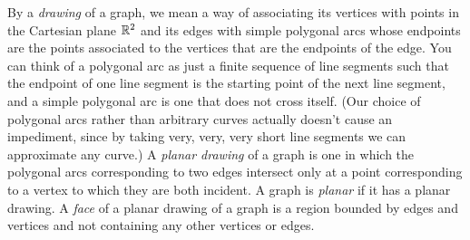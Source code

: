 By a \textit{drawing} of a graph, we mean a way of associating its
vertices with points in the Cartesian plane $\mathbb{R}^2$ and its edges
with simple polygonal arcs whose endpoints are the points associated
to the vertices that are the endpoints of the edge. You can think of a
polygonal arc as just a finite sequence of line segments such that the
endpoint of one line segment is the starting point of the next line
segment, and a simple polygonal arc is one that does not cross
itself. (Our choice of polygonal arcs rather than arbitrary curves
actually doesn't cause an impediment, since by taking very, very, very
short line segments we can approximate any curve.) A \textit{planar
  drawing} of a graph is one in which the polygonal arcs corresponding
to two edges intersect only at a point corresponding to a vertex to
which they are both incident. A graph is \textit{planar} if it has a
planar drawing. A \textit{face} of a planar drawing of a graph is a
region bounded by edges and vertices and not containing any other
vertices or edges.

